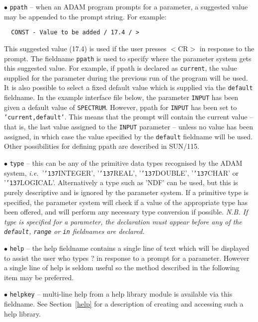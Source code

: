 \documentclass[twoside,11pt]{article}
\renewcommand{\_}{{\tt\char'137}}
\newcommand{\xref}[3]{#1}
\begin{document}
\begin{description}
\item{$\bullet$ \tt ppath} -- 
when an ADAM program prompts for a parameter, a suggested value
may be appended to the prompt string. For example:
\begin{verbatim}
  CONST - Value to be added / 17.4 / >
\end{verbatim}
This suggested value (17.4) is used if the user presses
$<$CR$>$ in response to the prompt.
The fieldname {\tt ppath} 
is used to specify where the parameter system gets this suggested value.
For example, if ppath is declared as {\tt current}, the value supplied for 
the parameter during the
previous run of the program will be used.
It is also possible to select a  fixed default value which is supplied
via the {\tt default}  fieldname.
In the example interface file below, the parameter {\tt INPUT}
has been given a default value of {\tt SPECTRUM}.
However, ppath for {\tt INPUT} has been 
set to {\tt 'current,default'}. This means that the prompt will contain the 
current value -- that is, the last 
value assigned to the {\tt INPUT} parameter -- unless no value has been assigned, in
which case the value specified by the {\tt default} fieldname will be used.
Other possibilities for defining ppath are described in 
\xref{SUN/115}{sun115}{}.

\item{$\bullet$ \tt type} -- this can be any of the primitive data types 
recognised by the ADAM system, {\it i.e.}\ '\_INTEGER', '\_REAL', '\_DOUBLE', 
'\_CHAR' or '\_LOGICAL'.
Alternatively a type such as 'NDF' can be used, but this is purely
descriptive and is ignored by the parameter system.
If a primitive type is specified, the parameter system 
will check if a value of the appropriate type has been offered, and will
perform any necessary type conversion if possible.
{\sl N.B. If type is specified for a parameter, the declaration  must appear 
before any of the {\tt default}, {\tt range} or  {\tt in} fieldnames
are declared.}

\item{$\bullet$ \tt help} -- the help fieldname contains a single line
of text which will be displayed to assist the user who types ? in response to a 
prompt for a parameter. However a single line of help is seldom useful so
the method described in the following item may be  preferred.

\item{$\bullet$ \tt helpkey} -- multi-line help from a help library
module is available via this 
fieldname. See Section~\ref{help} for a description of creating and
accessing such a help 
library.



\end{description}
\end{document}
